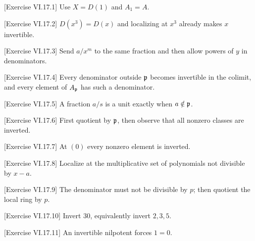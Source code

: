 \begin{hint}
[Exercise VI.17.1]
Use $X=D(1)$ and $A_1=A$.
\end{hint}

\begin{hint}
[Exercise VI.17.2]
$D(x^3)=D(x)$ and localizing at $x^3$ already makes $x$ invertible.
\end{hint}

\begin{hint}
[Exercise VI.17.3]
Send $a/x^m$ to the same fraction and then allow powers of $y$ in denominators.
\end{hint}

\begin{hint}
[Exercise VI.17.4]
Every denominator outside $\mathfrak p$ becomes invertible in the colimit, and every element of $A_{\mathfrak p}$ has such a denominator.
\end{hint}

\begin{hint}
[Exercise VI.17.5]
A fraction $a/s$ is a unit exactly when $a\notin\mathfrak p$.
\end{hint}

\begin{hint}
[Exercise VI.17.6]
First quotient by $\mathfrak p$, then observe that all nonzero classes are inverted.
\end{hint}

\begin{hint}
[Exercise VI.17.7]
At $(0)$ every nonzero element is inverted.
\end{hint}

\begin{hint}
[Exercise VI.17.8]
Localize at the multiplicative set of polynomials not divisible by $x-a$.
\end{hint}

\begin{hint}
[Exercise VI.17.9]
The denominator must not be divisible by $p$; then quotient the local ring by $p$.
\end{hint}

\begin{hint}
[Exercise VI.17.10]
Invert $30$, equivalently invert $2,3,5$.
\end{hint}

\begin{hint}
[Exercise VI.17.11]
An invertible nilpotent forces $1=0$.
\end{hint}


